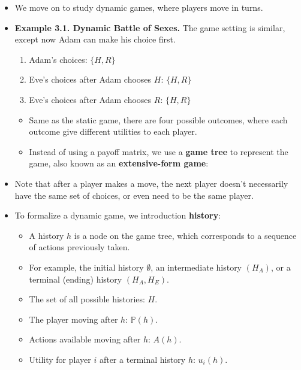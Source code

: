 \documentclass[notitlepage]{article}
\begin{document}
\begin{itemize}
    \item We move on to study dynamic games, where players move in turns.
    \item \textbf{Example 3.1. Dynamic Battle of Sexes.} The game setting is similar, except now Adam can make his choice first.
    \begin{enumerate}
        \item Adam's choices: \(\{H, R\}\)
        \item[2.1.] Eve's choices after Adam chooses \(H\): \(\{H, R\}\)
        \item[2.2.] Eve's choices after Adam chooses \(R\): \(\{H, R\}\)
    \end{enumerate}
    \begin{itemize}
    \item Same as the static game, there are four possible outcomes, where each outcome give different utilities to each player.
    \item Instead of using a payoff matrix, we use a \textbf{game tree} to represent the game, also known as an \textbf{extensive-form game}:
    \newpage

    \begin{figure}[h]
    \centering
    \resizebox{0.4\textwidth}{!}{
    
    }
    \end{figure}
    \end{itemize}

    \item Note that after a player makes a move, the next player doesn't necessarily have the same set of choices, or even need to be the same player.

    \begin{figure}[h]
    \centering
    \resizebox{0.4\textwidth}{!}{
    
    }
    \end{figure}

    \item To formalize a dynamic game, we introduction \textbf{history}:
    \begin{itemize}
        \item A history \(h\) is a node on the game tree, which corresponds to a sequence of actions previously taken.
        \item For example, the initial history \(\emptyset\), an intermediate history \((H_A)\), or a terminal (ending) history \((H_A, H_E)\).
        \item The set of all possible histories: \(H\).
        \item The player moving after \(h\): \(\mathbb{P}(h)\).
        \item Actions available moving after \(h\): \(A(h)\).
        \item Utility for player \(i\) after a terminal history \(h\): \(u_i(h)\).
    \end{itemize}


\end{itemize}
\end{document}
